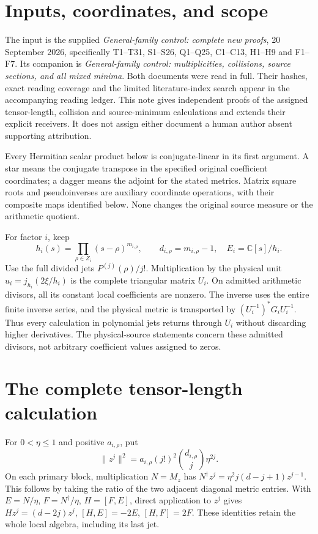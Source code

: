 \documentclass[11pt]{article}
\newcommand{\C}{\mathbb C}\newcommand{\R}{\mathbb R}
\begin{document}
\section{Inputs, coordinates, and scope}
The input is the supplied \emph{General-family control: complete new proofs},
20 September 2026, specifically T1--T31, S1--S26, Q1--Q25,
C1--C13, H1--H9 and F1--F7. Its companion is
\emph{General-family control: multiplicities, collisions, source sections,
and all mixed minima}. Both documents were read in full. Their hashes,
exact reading coverage and the limited literature-index search appear in
the accompanying reading ledger. This note gives independent proofs of
the assigned tensor-length, collision and source-minimum calculations and
extends their explicit receivers. It does not assign either document a
human author absent supporting attribution.

Every Hermitian scalar product below is conjugate-linear in its first
argument. A star means the conjugate transpose in the specified original
coefficient coordinates; a dagger means the adjoint for the stated
metrics. Matrix square roots and pseudoinverses are auxiliary coordinate
operations, with their composite maps identified below. None changes the
original source measure or the arithmetic quotient.

For factor $i$, keep
\[
h_i(s)=\prod_{\rho\in Z_i}(s-\rho)^{m_{i,\rho}},\qquad
d_{i,\rho}=m_{i,\rho}-1,
\quad E_i=\C[s]/h_i.
\]
Use the full divided jets $P^{(j)}(\rho)/j!$. Multiplication by the
physical unit $u_i=j_{h_i}(2\xi/h_i)$ is the complete triangular matrix
$U_i$. On admitted arithmetic divisors, all its constant local
coefficients are nonzero. The inverse uses the entire finite inverse
series, and the physical metric is transported by $(U_i^{-1})^*G_iU_i^{-1}$.
Thus every calculation in polynomial jets returns through $U_i$ without
discarding higher derivatives. The physical-source statements concern
these admitted divisors, not arbitrary coefficient values assigned to zeros.

\section{The complete tensor-length calculation}
For $0<\eta\le1$ and positive $a_{i,\rho}$, put
\[
\|z^j\|^2=a_{i,\rho}(j!)^2\binom{d_{i,\rho}}j\eta^{2j}.
\tag{GF1}
\]
On each primary block, multiplication $N=M_z$ has
$N^\dagger z^j=\eta^2j(d-j+1)z^{j-1}$. This follows by taking the
ratio of the two adjacent diagonal metric entries. With
$E=N/\eta$, $F=N^\dagger/\eta$, $H=[F,E]$, direct application to
$z^j$ gives $H z^j=(d-2j)z^j$, $[H,E]=-2E$, $[H,F]=2F$.
These identities retain the whole local algebra, including its last jet.
\end{document}
